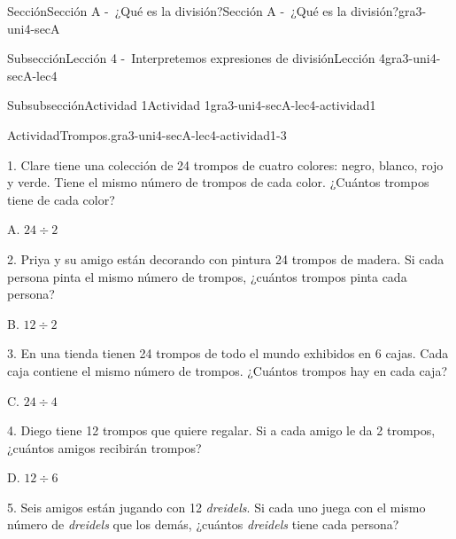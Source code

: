 \documentclass[twoside,14pt,]{extarticle}
\begin{document}
\begin{sectionptx}{Sección}{Sección A -~¿Qué es la división?}{}{Sección A -~¿Qué es la división?}{}{}{gra3-uni4-secA}
\begin{subsectionptx}{Subsección}{Lección 4 -~Interpretemos expresiones de división}{}{Lección 4}{}{}{gra3-uni4-secA-lec4}
\begin{subsubsectionptx}{Subsubsección}{Actividad 1}{}{Actividad 1}{}{}{gra3-uni4-secA-lec4-actividad1}
\begin{activity}{Actividad}{Trompos.}{gra3-uni4-secA-lec4-actividad1-3}
\begin{sidebyside}{2}{0.05}{0}{0.15}
\begin{sbspanel}{0.6}%
1. Clare tiene una colección de 24 trompos de cuatro colores: negro, blanco, rojo y verde. Tiene el mismo número de trompos de cada color. ¿Cuántos trompos tiene de cada color?%
\end{sbspanel}%
\begin{sbspanel}{0.2}%
\par
A. \(24 \div 2\)%
\end{sbspanel}%
\end{sidebyside}%
\begin{sidebyside}{2}{0.05}{0}{0.15}%
\begin{sbspanel}{0.6}%
2. Priya y su amigo están decorando con pintura 24 trompos de madera. Si cada persona pinta el mismo número de trompos, ¿cuántos trompos pinta cada persona?%
\end{sbspanel}%
\begin{sbspanel}{0.2}%
\par
B. \(12 \div 2\)%
\end{sbspanel}%
\end{sidebyside}%
\begin{sidebyside}{2}{0.05}{0}{0.15}%
\begin{sbspanel}{0.6}%
3. En una tienda tienen 24 trompos de todo el mundo exhibidos en 6 cajas. Cada caja contiene el mismo número de trompos. ¿Cuántos trompos hay en cada caja?%
\end{sbspanel}%
\begin{sbspanel}{0.2}%
\par
C. \(24 \div 4\)%
\end{sbspanel}%
\end{sidebyside}%
\begin{sidebyside}{2}{0.05}{0}{0.15}%
\begin{sbspanel}{0.6}%
4. Diego tiene 12 trompos que quiere regalar. Si a cada amigo le da 2 trompos, ¿cuántos amigos recibirán trompos?%
\end{sbspanel}%
\begin{sbspanel}{0.2}%
\par
D. \(12 \div 6\)%
\end{sbspanel}%
\end{sidebyside}%
\begin{sidebyside}{2}{0.05}{0}{0.15}%
\begin{sbspanel}{0.6}%
5. Seis amigos están jugando con 12 \emph{dreidels}. Si cada uno juega con el mismo número de \emph{dreidels} que los demás, ¿cuántos \emph{dreidels} tiene cada persona?%
\end{sbspanel}%

\end{sidebyside}
\end{activity}
\end{subsubsectionptx}
\end{subsectionptx}
\end{sectionptx}
\end{document}
